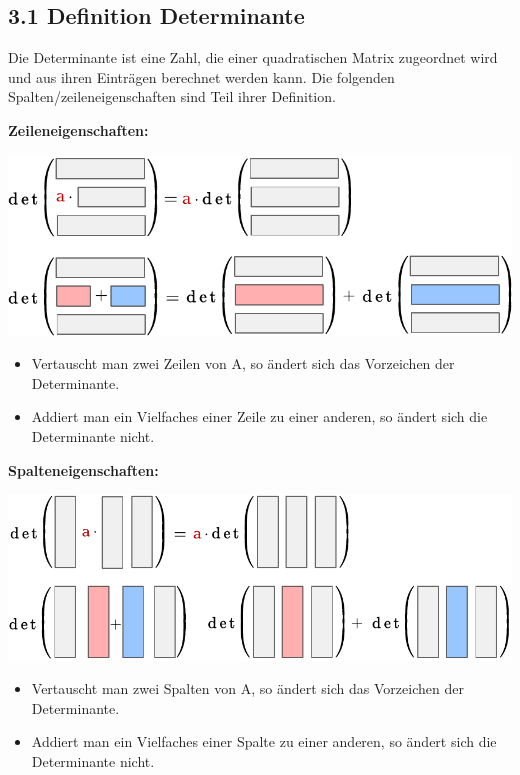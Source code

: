\subsection{3.1 Definition Determinante}{
\vskip1pt

Die Determinante ist eine Zahl, die einer quadratischen Matrix zugeordnet wird und aus ihren Einträgen berechnet werden kann. Die folgenden Spalten/zeileneigenschaften sind Teil ihrer Definition.

\vskip3pt

\textbf{Zeileneigenschaften:}
\vskip2pt

\includegraphics[width = 0.95 \columnwidth]{3_Determinante/Det_Zeilen.pdf}

\begin{itemize}[leftmargin=0.29cm, itemsep=0.5pt]
\item Vertauscht man zwei Zeilen von A, so ändert sich das Vorzeichen der Determinante. 
\item Addiert man ein Vielfaches einer Zeile zu einer anderen, so ändert sich die Determinante nicht.
\end{itemize}

\vskip2pt

\textbf{Spalteneigenschaften:}
\vskip2pt

\includegraphics[width = 0.95 \columnwidth]{3_Determinante/Det_Spalten.pdf}

\begin{itemize}[leftmargin=0.29cm, itemsep=0.5pt]
\item Vertauscht man zwei Spalten von A, so ändert sich das Vorzeichen der Determinante. 
\item Addiert man ein Vielfaches einer Spalte zu einer anderen, so ändert sich die Determinante nicht.
\end{itemize}


}
